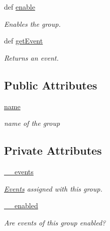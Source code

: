 \begin{DoxyCompactItemize}
def \hyperlink{class_event_1_1_event_group_ad7e8b3ca8ac34c86df5918f405291348}{enable}
\begin{DoxyCompactList}\small\item\em Enables the group. \item\end{DoxyCompactList}\item 
def \hyperlink{class_event_1_1_event_group_a150001e28345ca99551fc06e63592f19}{getEvent}
\begin{DoxyCompactList}\small\item\em Returns an event. \item\end{DoxyCompactList}\end{DoxyCompactItemize}
\subsection*{Public Attributes}
\begin{DoxyCompactItemize}
\item 
\hyperlink{class_event_1_1_event_group_a5d5ff8c585cc7abeb5e50d1c81d40813}{name}
\begin{DoxyCompactList}\small\item\em name of the group \item\end{DoxyCompactList}\end{DoxyCompactItemize}
\subsection*{Private Attributes}
\begin{DoxyCompactItemize}
\item 
\hyperlink{class_event_1_1_event_group_ac27ccf54470339b7343b424c86da8ab9}{\_\-\_\-events}
\begin{DoxyCompactList}\small\item\em \hyperlink{namespace_event}{Events} assigned with this group. \item\end{DoxyCompactList}\item 
\hyperlink{class_event_1_1_event_group_af1cda284012e3badea391a0f9573c964}{\_\-\_\-enabled}
\begin{DoxyCompactList}\small\item\em Are events of this group enabled? \item\end{DoxyCompactList}\end{DoxyCompactItemize}


